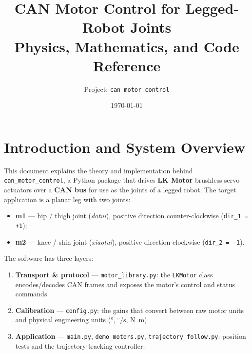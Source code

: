 \documentclass[11pt,a4paper]{article}
\title{\textbf{CAN Motor Control for Legged-Robot Joints}\\[4pt]
\large Physics, Mathematics, and Code Reference}
\author{Project: \texttt{can\_motor\_control}}
\date{\today}
\newcommand{\dps}{\ensuremath{^\circ/\mathrm{s}}}
\newcommand{\code}[1]{\texttt{#1}}
\begin{document}
\maketitle
\tableofcontents
\newpage

\section{Introduction and System Overview}

This document explains the theory and implementation behind
\texttt{can\_motor\_control}, a Python package that drives \textbf{LK Motor}
brushless servo actuators over a \textbf{CAN bus} for use as the joints of a
legged robot. The target application is a planar leg with two joints:

\begin{itemize}[nosep]
  \item \textbf{m1} --- hip / thigh joint (\emph{datui}), positive direction
        counter-clockwise (\code{dir\_1 = +1});
  \item \textbf{m2} --- knee / shin joint (\emph{xiaotui}), positive direction
        clockwise (\code{dir\_2 = -1}).
\end{itemize}

The software has three layers:
\begin{enumerate}[nosep]
  \item \textbf{Transport \& protocol} --- \code{motor\_library.py}: the
        \code{LKMotor} class encodes/decodes CAN frames and exposes the motor's
        control and status commands.
  \item \textbf{Calibration} --- \code{config.py}: the gains that convert
        between raw motor units and physical engineering units
        (\si{\degree}, \dps{}, \si{\newton\meter}).
  \item \textbf{Application} --- \code{main.py}, \code{demo\_motors.py},
        \code{trajectory\_follow.py}: position tests and the trajectory-tracking
        controller.
\end{enumerate}
\end{document}
